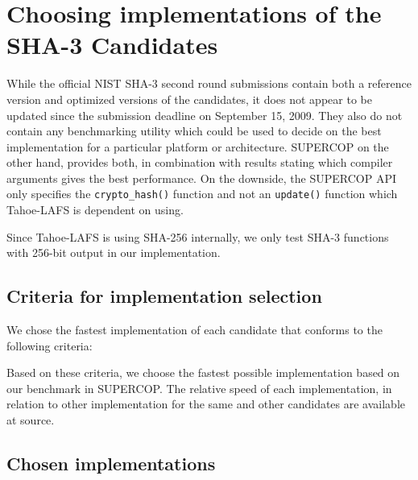 \documentclass[english,12pt,a4paper]{book}
\begin{document}
\section{Choosing implementations of the SHA-3 Candidates}

While the official \ac{NIST} \ac{SHA}-3 second round submissions contain both
a reference version and optimized versions of the candidates, it does not
appear to be updated since the submission deadline on September 15, 2009. They
also do not contain any benchmarking utility which could be used to decide on
the best implementation for a particular platform or architecture. \ac{SUPERCOP}
on the other hand, provides both, in combination with results stating which
compiler arguments gives the best performance. On the downside, the
\ac{SUPERCOP} \ac{API} only specifies the \texttt{crypto\_hash()} function and
not an \texttt{update()} function which Tahoe-\ac{LAFS} is dependent on using.

Since Tahoe-\ac{LAFS} is using \ac{SHA}-256 internally, we only test \ac{SHA}-3
functions with 256-bit output in our implementation. 


\subsection{Criteria for implementation selection}

We chose the fastest implementation of each candidate that conforms to the
following criteria:

Based on these criteria, we choose the fastest possible implementation based
on our benchmark in \ac{SUPERCOP}. The relative speed of each implementation, in
relation to other implementation for the same and other candidates are
available at source.

\subsection{Chosen implementations}
\end{document}
